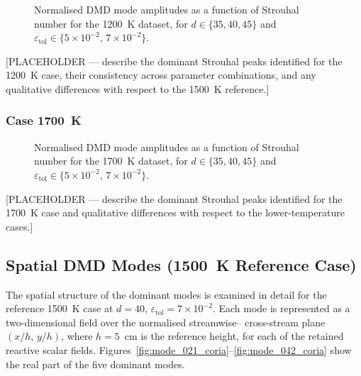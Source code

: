 \begin{figure}[htbp]
    \centering
    \caption{Normalised DMD mode amplitudes as a function of Strouhal number for the
    1200~K dataset, for $d \in \{35,40,45\}$ and
    $\varepsilon_{\mathrm{tol}} \in \{5\times10^{-2},\, 7\times10^{-2}\}$.}
    \label{fig:spectrum_1200K}
\end{figure}
\FloatBarrier

[PLACEHOLDER — describe the dominant Strouhal peaks identified for the 1200~K case,
their consistency across parameter combinations, and any qualitative differences with
respect to the 1500~K reference.]

\subsubsection{Case 1700~K}
\label{sec:spectrum_1700K}

\begin{figure}[htbp]
    \centering
    \caption{Normalised DMD mode amplitudes as a function of Strouhal number for the
    1700~K dataset, for $d \in \{35,40,45\}$ and
    $\varepsilon_{\mathrm{tol}} \in \{5\times10^{-2},\, 7\times10^{-2}\}$.}
    \label{fig:spectrum_1700K}
\end{figure}
\FloatBarrier

[PLACEHOLDER — describe the dominant Strouhal peaks identified for the 1700~K case
and qualitative differences with respect to the lower-temperature cases.]

\subsection{Spatial DMD Modes (1500~K Reference Case)}
\label{sec:spatial_modes}

The spatial structure of the dominant modes is examined in detail for the reference
1500~K case at $d = 40$, $\varepsilon_{\mathrm{tol}} = 7\times10^{-2}$.
Each mode is represented as a two-dimensional field over the normalised streamwise--
cross-stream plane $(x/h,\, y/h)$, where $h = 5$~cm is the reference height, for each
of the retained reactive scalar fields.
Figures~\ref{fig:mode_021_coria}--\ref{fig:mode_042_coria} show the real part of the
five dominant modes.

